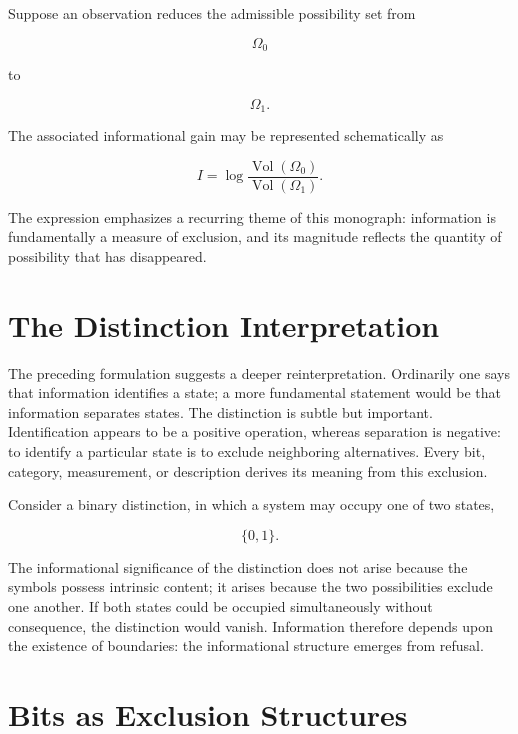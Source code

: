 \documentclass[11pt,oneside]{book}
\theoremstyle{plain}
\theoremstyle{definition}
\theoremstyle{remark}
\DeclareMathOperator{\Vol}{Vol}
\begin{document}
Suppose an observation reduces the admissible possibility set from

\begin{equation}
\Omega_0
\end{equation}

to

\begin{equation}
\Omega_1.
\end{equation}

The associated informational gain may be represented schematically as

\begin{equation}
I
=
\log
\frac{\Vol(\Omega_0)}
{\Vol(\Omega_1)}.
\end{equation}

The expression emphasizes a recurring theme of this monograph: information is fundamentally a measure of exclusion, and its magnitude reflects the quantity of possibility that has disappeared.

\section{The Distinction Interpretation}

The preceding formulation suggests a deeper reinterpretation. Ordinarily one says that information identifies a state; a more fundamental statement would be that information separates states. The distinction is subtle but important. Identification appears to be a positive operation, whereas separation is negative: to identify a particular state is to exclude neighboring alternatives. Every bit, category, measurement, or description derives its meaning from this exclusion.

Consider a binary distinction, in which a system may occupy one of two states,

\begin{equation}
\{0,1\}.
\end{equation}

The informational significance of the distinction does not arise because the symbols possess intrinsic content; it arises because the two possibilities exclude one another. If both states could be occupied simultaneously without consequence, the distinction would vanish. Information therefore depends upon the existence of boundaries: the informational structure emerges from refusal.

\section{Bits as Exclusion Structures}
\end{document}
